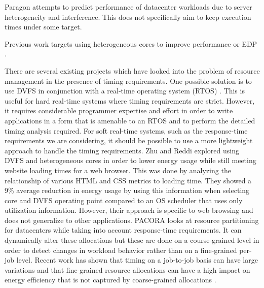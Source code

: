 Paragon \cite{paragon-asplos13} attempts to predict performance of datacenter
workloads due to server heterogeneity and interference. This does not
specifically aim to keep execution times under some target.

Previous work targets using heterogeneous cores to improve performance
\cite{paragon-asplos13, pie-isca12, heteroscouts-sigmetrics11} or EDP \cite{chen-dac09}.

There are several existing projects which have looked into the problem of
resource management in the presence of timing requirements. One possible
solution is to use DVFS in conjunction with a real-time operating system (RTOS)
\cite{rtdvfs-systor12}. This is useful for hard real-time systems where timing
requirements are strict. However, it requires considerable programmer expertise
and effort in order to write applications in a form that is amenable to an RTOS
and to perform the detailed timing analysis required. For soft real-time
systems, such as the response-time requirements we are considering, it should
be possible to use a more lightweight approach to handle the timing
requirements. Zhu and Reddi \cite{zhu-hpca13} explored using DVFS and
heterogeneous cores in order to lower energy usage while still meeting website
loading times for a web browser. This was done by analyzing the relationship of
various HTML and CSS metrics to loading time. They showed a 9\% average
reduction in energy usage by using this information when selecting core and
DVFS operating point compared to an OS scheduler that uses only utilization
information.  However, their approach is specific to web browsing and does not
generalize to other applications. PACORA \cite{pacora-hotpar11} looks at
resource partitioning for datacenters while taking into account response-time
requirements. It can dynamically alter these allocations but these are done on
a course-grained level in order to detect changes in workload behavior rather
than on a fine-grained per-job level. Recent work has shown that timing on a
job-to-job basis can have large variations \cite{atlas-rtas13} and that
fine-grained resource allocations can have a high impact on energy efficiency
that is not captured by coarse-grained allocations \cite{padmanabha-micro13}.

